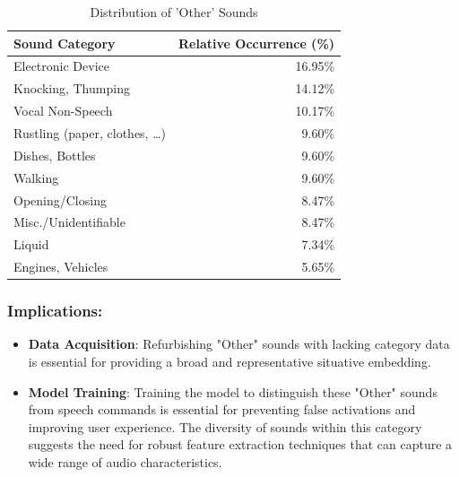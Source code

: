 \begin{table}[h]
    \centering
    \caption{Distribution of 'Other' Sounds}
    \label{tab:sounds_distribution}
    {\tiny
    \begin{tabular}{lr}
        \toprule
        Sound Category & Relative Occurrence (\%) \\
        \midrule
        Electronic Device & 16.95\% \\
        Knocking, Thumping & 14.12\% \\
        Vocal Non-Speech & 10.17\% \\
        Rustling (paper, clothes, \ldots) & 9.60\% \\
        Dishes, Bottles & 9.60\% \\
        Walking & 9.60\% \\
        Opening/Closing & 8.47\% \\
        Misc./Unidentifiable & 8.47\% \\
        Liquid & 7.34\% \\
        Engines, Vehicles & 5.65\% \\
        \bottomrule
    \end{tabular}
    }
\end{table}

\subsubsection{Implications:}

\begin{itemize}
    \item \textbf{Data Acquisition}: Refurbishing "Other" sounds with lacking category data is
    essential for providing a broad and representative situative embedding.
    \item \textbf{Model Training}: Training the model to distinguish these "Other" sounds from speech commands is
    essential for preventing false activations and improving user experience.
    The diversity of sounds within this category suggests the need for robust feature extraction techniques that can
    capture a wide range of audio characteristics.
\end{itemize}
